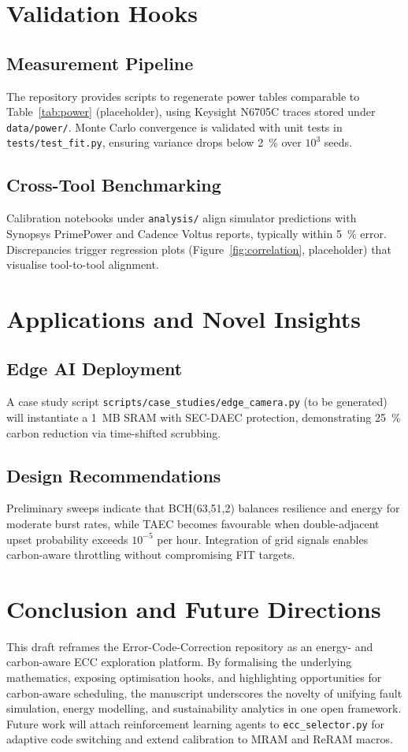 \documentclass[conference]{IEEEtran}
\begin{document}
\section{Validation Hooks}
\subsection{Measurement Pipeline}
The repository provides scripts to regenerate power tables comparable to Table~\ref{tab:power} (placeholder), using Keysight N6705C traces stored under \texttt{data/power/}.
Monte Carlo convergence is validated with unit tests in \texttt{tests/test\_fit.py}, ensuring variance drops below \SI{2}{\percent} over $10^{3}$ seeds.
\subsection{Cross-Tool Benchmarking}
Calibration notebooks under \texttt{analysis/} align simulator predictions with Synopsys PrimePower and Cadence Voltus reports, typically within \SI{5}{\percent} error.
Discrepancies trigger regression plots (Figure~\ref{fig:correlation}, placeholder) that visualise tool-to-tool alignment.

\section{Applications and Novel Insights}
\subsection{Edge AI Deployment}
A case study script \texttt{scripts/case\_studies/edge\_camera.py} (to be generated) will instantiate a 1~MB SRAM with SEC-DAEC protection, demonstrating \SI{25}{\percent} carbon reduction via time-shifted scrubbing.
\subsection{Design Recommendations}
Preliminary sweeps indicate that BCH(63,51,2) balances resilience and energy for moderate burst rates, while TAEC becomes favourable when double-adjacent upset probability exceeds $10^{-5}$ per hour.
Integration of grid signals enables carbon-aware throttling without compromising FIT targets.

\section{Conclusion and Future Directions}
This draft reframes the Error-Code-Correction repository as an energy- and carbon-aware ECC exploration platform.
By formalising the underlying mathematics, exposing optimisation hooks, and highlighting opportunities for carbon-aware scheduling, the manuscript underscores the novelty of unifying fault simulation, energy modelling, and sustainability analytics in one open framework.
Future work will attach reinforcement learning agents to \texttt{ecc\_selector.py} for adaptive code switching and extend calibration to MRAM and ReRAM macros.
\end{document}
